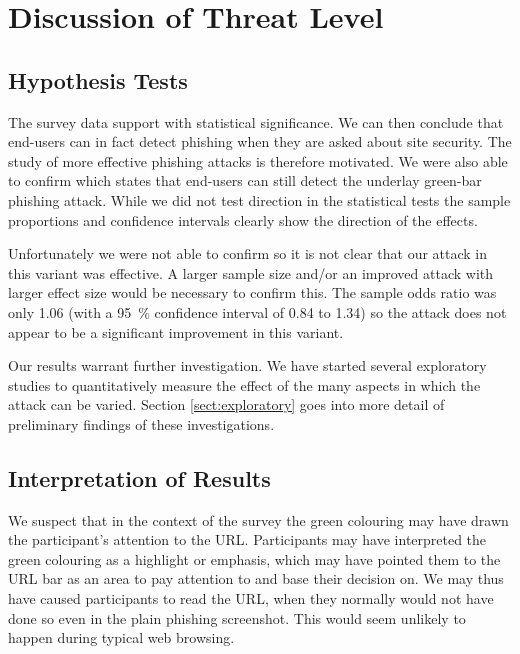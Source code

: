 \documentclass[twoside,letterpaper]{soups}
\begin{document}


\section{Discussion of Threat Level}


\subsection{Hypothesis Tests}

The survey data support  with statistical significance. We can then conclude that end-users can in fact detect phishing when they are asked about site security. The study of more effective phishing attacks is therefore motivated.
We were also able to confirm  which states that end-users can still detect the underlay green-bar phishing attack. %
While we did not test direction in the statistical tests the sample proportions and confidence intervals clearly show the direction of the effects.

Unfortunately we were not able to confirm  so it is not clear that our attack in this variant was effective. A larger sample size and/or an improved attack with larger effect size would be necessary to confirm this. The sample odds ratio was only 1.06 (with a 95~\% confidence interval of 0.84 to 1.34) so the attack does not appear to be a significant improvement in this variant.

Our results warrant further investigation. We have started several exploratory studies to quantitatively measure the effect of the many aspects in which the attack can be varied. Section \ref{sect:exploratory} goes into more detail of preliminary findings of these investigations.

\subsection{Interpretation of Results}

We suspect that in the context of the survey the green colouring may have drawn the participant's attention to the URL. Participants may have interpreted the green colouring as a highlight or emphasis, which may have pointed them to the URL bar as an area to pay attention to and base their decision on. We may thus have caused participants to read the URL, when they normally would not have done so even in the plain phishing screenshot. This would seem unlikely to happen during typical web browsing.
\end{document}
